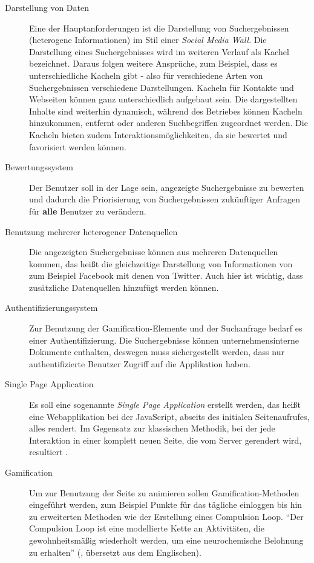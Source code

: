 \documentclass[12pt,twoside]{book}
\begin{document}
\begin{description}

\item[Darstellung von Daten]

Eine der Hauptanforderungen ist die Darstellung von Suchergebnissen (heterogene Informationen) im Stil einer \textit{Social Media Wall}. Die Darstellung eines Suchergebnisses wird im weiteren Verlauf als Kachel bezeichnet. Daraus folgen weitere Ansprüche, zum Beispiel, dass es unterschiedliche Kacheln gibt - also für verschiedene Arten von Suchergebnissen verschiedene Darstellungen. Kacheln für Kontakte und Webseiten können ganz unterschiedlich aufgebaut sein. Die dargestellten Inhalte sind weiterhin dynamisch, während des Betriebes können Kacheln hinzukommen, entfernt oder anderen Suchbegriffen zugeordnet werden. Die Kacheln bieten zudem Interaktionsmöglichkeiten, da sie bewertet und favorisiert werden können.

\item[Bewertungssystem]

  Der Benutzer soll in der Lage sein, angezeigte Suchergebnisse zu bewerten und dadurch die Priorisierung von Suchergebnissen zukünftiger Anfragen für \textbf{alle} Benutzer zu verändern.

\item[Benutzung mehrerer heterogener Datenquellen]
  Die angezeigten Suchergebnisse können aus mehreren Datenquellen kommen, das heißt die gleichzeitige Darstellung von Informationen von zum Beispiel Facebook mit denen von Twitter. Auch hier ist wichtig, dass zusätzliche Datenquellen hinzufügt werden können.

\item[Authentifizierungssystem]
	Zur Benutzung der Gamification-Elemente und der Suchanfrage bedarf es einer Authentifizierung. Die Suchergebnisse können unternehmensinterne Dokumente enthalten, deswegen muss sichergestellt werden, dass nur authentifizierte Benutzer Zugriff auf die Applikation haben.

\item[Single Page Application]
  Es soll eine sogenannte \textit{Single Page Application} erstellt werden, das heißt eine Webapplikation bei der JavaScript, abseits des initialen Seitenaufrufes, alles rendert. Im Gegensatz zur klassischen Methodik, bei der jede Interaktion in einer komplett neuen Seite, die vom Server gerendert wird, resultiert \cite{mesbah2007migrating}.

\item[Gamification]
  Um zur Benutzung der Seite zu animieren sollen Gamification-Methoden eingeführt werden, zum Beispiel Punkte für das tägliche einloggen bis hin zu erweiterten Methoden wie der Erstellung eines Compulsion Loop. ``Der Compulsion Loop ist eine modellierte Kette an Aktivitäten, die gewohnheitsmäßig wiederholt werden, um eine neurochemische Belohnung zu erhalten'' (\cite{gamasutra}, übersetzt aus dem Englischen).


\end{description}
\end{document}
